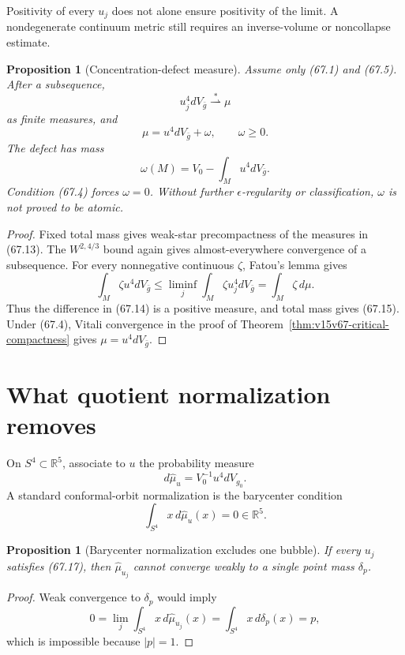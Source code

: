 \documentclass[11pt]{article}
\newtheorem{proposition}[theorem]{Proposition}
\theoremstyle{remark}
\begin{document}
Positivity of every \(u_j\) does not alone ensure positivity of
the limit.  A nondegenerate continuum metric still requires an
inverse-volume or noncollapse estimate.

\begin{proposition}[Concentration-defect measure]
\label{prop:v15v67-defect}
Assume only (67.1) and (67.5).  After a subsequence,
\[
 u_j^4dV_{\bar g}\stackrel{*}{\rightharpoonup}\mu     \tag{67.13}
\]
as finite measures, and
\[
 \mu=u^4dV_{\bar g}+\omega,\qquad \omega\geq0.         \tag{67.14}
\]
The defect has mass
\[
 \omega(M)=V_0-\int_Mu^4dV_{\bar g}.                  \tag{67.15}
\]
Condition (67.4) forces \(\omega=0\).  Without further
\(\epsilon\)-regularity or classification, \(\omega\) is not
proved to be atomic.
\end{proposition}

\begin{proof}
Fixed total mass gives weak-star precompactness of the measures in
(67.13).  The \(W^{2,4/3}\) bound again gives almost-everywhere
convergence of a subsequence.  For every nonnegative continuous
\(\zeta\), Fatou's lemma gives
\[
 \int_M\zeta u^4dV_{\bar g}
 \leq\liminf_j\int_M\zeta u_j^4dV_{\bar g}
 =
 \int_M\zeta\,d\mu.
\]
Thus the difference in (67.14) is a positive measure, and total
mass gives (67.15).  Under (67.4), Vitali convergence in the proof
of Theorem~\ref{thm:v15v67-critical-compactness} gives
\(\mu=u^4dV_{\bar g}\).
\end{proof}

\section{What quotient normalization removes}

On \(S^4\subset{\mathbb R}^5\), associate to \(u\) the probability
measure
\[
 d\widehat\mu_u
 =
 V_0^{-1}u^4dV_{g_0}.                                 \tag{67.16}
\]
A standard conformal-orbit normalization is the barycenter
condition
\[
 \int_{S^4}x\,d\widehat\mu_u(x)=0\in{\mathbb R}^5.     \tag{67.17}
\]

\begin{proposition}[Barycenter normalization excludes one bubble]
\label{prop:v15v67-barycenter}
If every \(u_j\) satisfies (67.17), then
\(\widehat\mu_{u_j}\) cannot converge weakly to a single point mass
\(\delta_p\).
\end{proposition}

\begin{proof}
Weak convergence to \(\delta_p\) would imply
\[
 0
 =
 \lim_j\int_{S^4}x\,d\widehat\mu_{u_j}(x)
 =
 \int_{S^4}x\,d\delta_p(x)=p,
\]
which is impossible because \(|p|=1\).
\end{proof}
\end{document}
